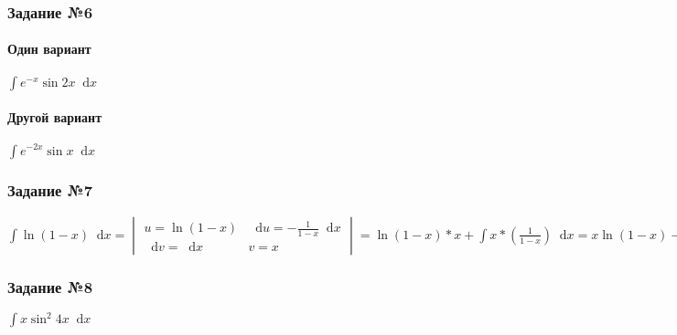 \documentclass{article}
\newcommand*\diff{\mathop{}\!\mathrm{d}}
\begin{document}
\subsubsection{Задание №6}

\paragraph{Один вариант}

$
\int e^{-x} \sin 2 x \diff x
$

\paragraph{Другой вариант}

$
\int e^{- 2 x} \sin x \diff x 
$

\subsubsection{Задание №7}

$
\int \ln (1 - x) \diff x = \begin{vmatrix}
    u = \ln (1 - x) & \diff u = - \frac{1}{1 - x} \diff x \\
    \diff v = \diff x & v = x
\end{vmatrix} = \ln (1 - x) * x + \int x * (\frac{1}{1 - x}) \diff x = x \ln (1 - x) - \int \frac{-x}{1 - x} \diff x = x \ln (1 - x) - \int \frac{1 - x + 1}{1 - x} \diff x = x \ln (1 - x) - \int \frac{1 - x}{1 - x} * x + \int \frac{\diff x}{-1 + x} = x \ln (1 - x) - x + \ln |x - 1| + C
$

\subsubsection{Задание №8}

$\int x \sin^2 4x \diff x$
\end{document}
